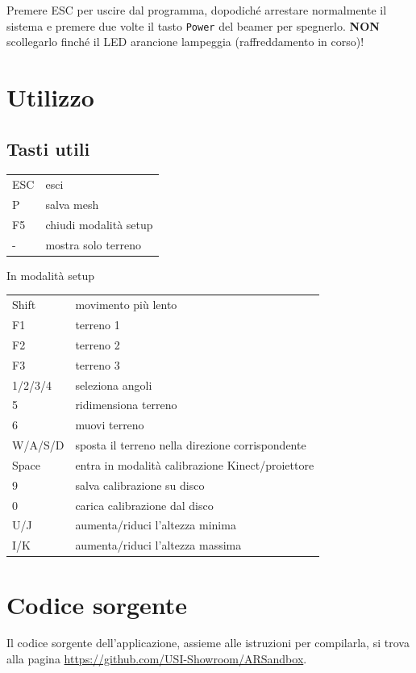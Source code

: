 \documentclass[12pt]{article}
\begin{document}
		Premere ESC per uscire dal programma, dopodiché arrestare normalmente il sistema e 
		premere due volte il tasto \texttt{Power} del beamer per spegnerlo. \textbf{NON} scollegarlo finché
		il LED arancione lampeggia (raffreddamento in corso)!
		
		
\section{Utilizzo}

	\subsection{Tasti utili}
	
	\begin{tabular}{l l}
		ESC & esci\\
		P & salva mesh\\
		F5 & chiudi modalità setup\\
		- & mostra solo terreno\\
	\end{tabular}

	In modalità setup

	\begin{tabular}{l l}
		Shift & movimento più lento\\

		F1 & terreno 1\\
		F2 & terreno 2\\
		F3 & terreno 3\\

		1/2/3/4 & seleziona angoli\\
		5 & ridimensiona terreno\\
		6 & muovi terreno\\

		W/A/S/D & sposta il terreno nella direzione corrispondente\\

		Space & entra in modalità calibrazione Kinect/proiettore\\

		9 & salva calibrazione su disco\\
		0 & carica calibrazione dal disco\\

		U/J & aumenta/riduci l'altezza minima\\
		I/K & aumenta/riduci l'altezza massima\\
	\end{tabular}
		
		
\section{Codice sorgente}

	Il codice sorgente dell'applicazione, assieme alle istruzioni per compilarla, si trova alla pagina \url{https://github.com/USI-Showroom/ARSandbox}.
		
	
\end{document}
